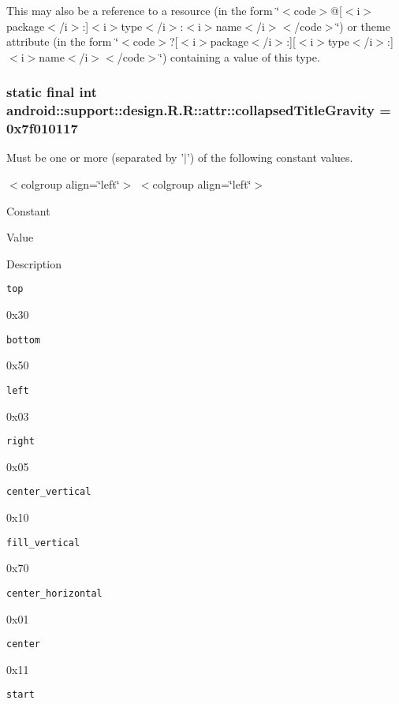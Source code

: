 This may also be a reference to a resource (in the form \char`\"{}$<$code$>$@\mbox{[}$<$i$>$package$<$/i$>$:\mbox{]}$<$i$>$type$<$/i$>$:$<$i$>$name$<$/i$>$$<$/code$>$\char`\"{}) or theme attribute (in the form \char`\"{}$<$code$>$?\mbox{[}$<$i$>$package$<$/i$>$:\mbox{]}\mbox{[}$<$i$>$type$<$/i$>$:\mbox{]}$<$i$>$name$<$/i$>$$<$/code$>$\char`\"{}) containing a value of this type. \hypertarget{classandroid_1_1support_1_1design_1_1_r_1_1attr_f7d31e48f895cdcc822f01402dc75587}{
\subsubsection[{collapsedTitleGravity}]{\setlength{\rightskip}{0pt plus 5cm}static final int android::support::design.R.R::attr::collapsedTitleGravity = 0x7f010117}}
\label{classandroid_1_1support_1_1design_1_1_r_1_1attr_f7d31e48f895cdcc822f01402dc75587}


Must be one or more (separated by '$|$') of the following constant values. \begin{TabularC}{0}
\hline
\end{TabularC}
$<$colgroup align=\char`\"{}left\char`\"{}$>$ $<$colgroup align=\char`\"{}left\char`\"{}$>$ 

Constant

Value

Description 

{\tt top}

0x30

{\tt bottom}

0x50

{\tt left}

0x03

{\tt right}

0x05

{\tt center\_\-vertical}

0x10

{\tt fill\_\-vertical}

0x70

{\tt center\_\-horizontal}

0x01

{\tt center}

0x11

{\tt start}

